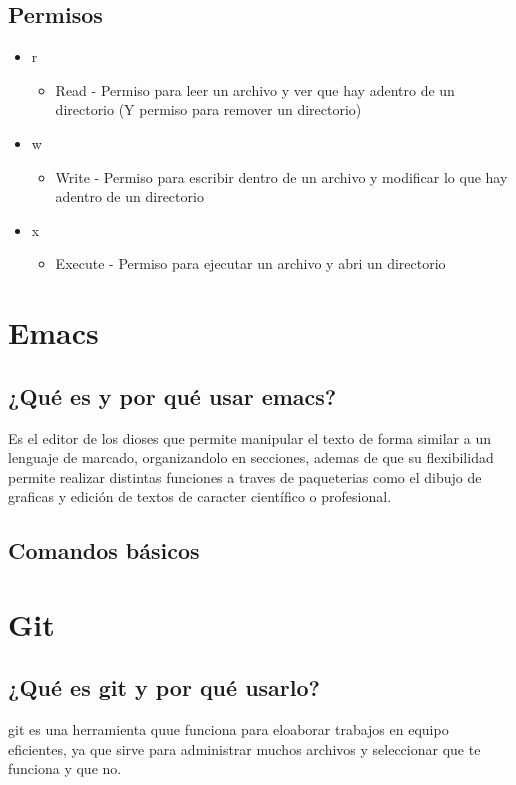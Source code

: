 \documentclass[11pt,letterpaper]{article}
\begin{document}
  \subsection{Permisos}
  \begin{itemize}
    
  \item r
    \begin{itemize}
    \item Read - Permiso para leer un archivo y ver que hay adentro de un directorio (Y permiso para remover un directorio)
    \end {itemize}
    
  \item w
    \begin {itemize}
    \item Write - Permiso para escribir dentro de un archivo y modificar lo que hay adentro de un directorio
    \end {itemize}
    
  \item x
    \begin {itemize}
    \item Execute - Permiso para ejecutar un archivo y abri un directorio
    \end {itemize}
  \end {itemize}

  
\section{Emacs}
\subsection{¿Qué es y por qué usar emacs?}
Es el editor de los dioses que permite manipular el texto de forma similar a un lenguaje de marcado, organizandolo en secciones, ademas de que su flexibilidad permite realizar distintas funciones a traves de paqueterias como el dibujo de graficas y edición de textos de caracter científico o profesional.
\subsection{Comandos básicos}

\section{Git}
\subsection{¿Qué es git y por qué usarlo?}
git es una herramienta quue funciona para eloaborar trabajos en equipo eficientes, ya que sirve para administrar muchos archivos y seleccionar que te funciona y que no.
\end{document}
